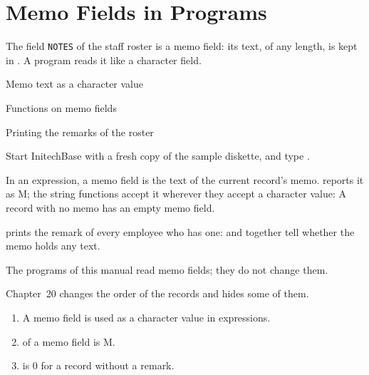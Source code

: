 \chapter{Memo Fields in Programs}
The field \texttt{NOTES} of the staff roster is a memo field: its text, of any
length, is kept in .  A program reads it like a character
field.

\begin{ChapterCovers}
\item Memo text as a character value
\item Functions on memo fields
\item Printing the remarks of the roster
\end{ChapterCovers}

Start InitechBase with a fresh copy of the sample diskette, and type
.

In an expression, a memo field is the text of the current record's memo.
 reports it as M; the string functions accept it wherever they
accept a character value:
A record with no memo has an empty memo field.

 prints the remark of every employee who has one:
 and  together tell whether the memo holds any text.

\begin{AteNote}
The programs of this manual read memo fields; they do not change them.
\end{AteNote}

Chapter~20 changes the order of the records and hides some of them.

\begin{enumerate}
\item A memo field is used as a character value in expressions.
\item {} of a memo field is M.
\item {} is 0 for a record without a remark.
\end{enumerate}
